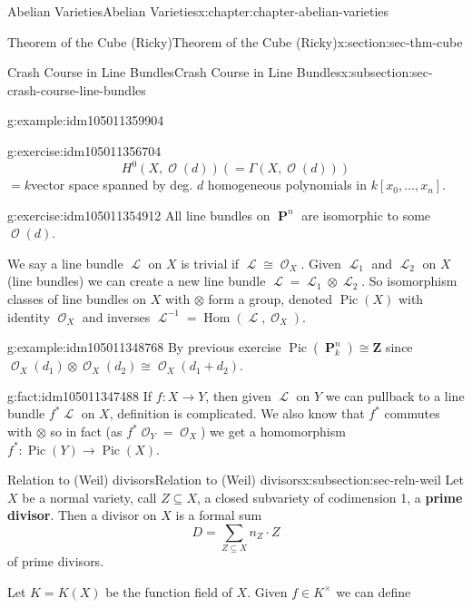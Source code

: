 \documentclass[oneside,10pt,]{book}
\newcommand{\terminology}[1]{\textbf{#1}}
\numberwithin{equation}{section}
\newcommand{\sheaf}[1]{\operatorname{\mathcal{#1}}}
\newcommand{\ZZ}{\mathbf{Z}}
\DeclareMathOperator{\Hom}{Hom}
\DeclareMathOperator{\Pic}{Pic}
\DeclareMathOperator{\PP}{\mathbf{P}}
\begin{document}
\begin{chapterptx}{Abelian Varieties}{}{Abelian Varieties}{}{}{x:chapter:chapter-abelian-varieties}
\begin{sectionptx}{Theorem of the Cube (Ricky)}{}{Theorem of the Cube (Ricky)}{}{}{x:section:sec-thm-cube}
\begin{subsectionptx}{Crash Course in Line Bundles}{}{Crash Course in Line Bundles}{}{}{x:subsection:sec-crash-course-line-bundles}
\begin{example}{}{g:example:idm105011359904}
\end{example}
\begin{inlineexercise}{}{g:exercise:idm105011356704}%
%
\begin{equation*}
H^0(X,\sheaf O(d)) ( = \Gamma (X,\sheaf O(d)))
\end{equation*}
\(= k\)vector space spanned by deg. \(d\) homogeneous polynomials in \(k[x_0,\ldots, x_n]\).%
\end{inlineexercise}
\begin{inlineexercise}{}{g:exercise:idm105011354912}%
All line bundles on \(\PP^n\) are isomorphic to some \(\sheaf O(d)\).%
\end{inlineexercise}
We say a line bundle \(\sheaf L\) on \(X\) is trivial if \(\sheaf L \cong \sheaf O_X\). Given \(\sheaf L_1\) and \(\sheaf L_2\) on \(X\) (line bundles) we can create a new line bundle \(\sheaf L = \sheaf L_1 \otimes \sheaf L_2\). So isomorphism classes of line bundles on \(X\) with \(\otimes\) form a group, denoted \(\Pic(X)\) with identity \(\sheaf O_X\) and inverses \(\sheaf L^{-1} = \Hom(\sheaf L , \sheaf O_X)\).%
\begin{example}{}{g:example:idm105011348768}%
By previous exercise \(\Pic(\PP_k^n) \cong \ZZ\) since \(\sheaf O_X(d_1) \otimes \sheaf O_X(d_2)  \cong \sheaf O_X(d_1+d_2)\).%
\end{example}
\begin{fact}{}{}{g:fact:idm105011347488}%
If \(f\colon X \to Y\), then given \(\sheaf L\) on \(Y\) we can pullback to a line bundle \(f^* \sheaf L\) on \(X\), definition is complicated. We also know that \(f^*\) commutes with \(\otimes\) so in fact (as \(f^*\sheaf O_Y = \sheaf O_X\)) we get a homomorphism \(f^* \colon \Pic(Y) \to \Pic(X)\).%
\end{fact}
\end{subsectionptx}
%
%
\typeout{************************************************}
\typeout{************************************************}
%
\begin{subsectionptx}{Relation to (Weil) divisors}{}{Relation to (Weil) divisors}{}{}{x:subsection:sec-reln-weil}
Let \(X\) be a normal variety, call \(Z\subseteq X\), a closed subvariety of codimension 1, a \terminology{prime divisor}. Then a divisor on \(X\) is a formal sum%
\begin{equation*}
D = \sum_{Z\subseteq X} n_Z\cdot Z
\end{equation*}
of prime divisors.%
\par
Let \(K = K(X)\) be the function field of \(X\). Given \(f\in K^\times\) we can define%

\end{subsectionptx}
\end{sectionptx}
\end{chapterptx}
\end{document}
